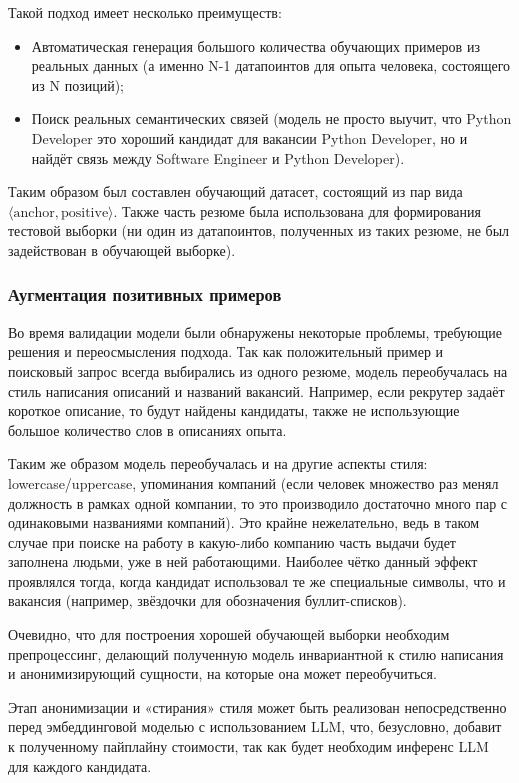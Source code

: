 \documentclass[14pt]{mmcs_article}
\begin{document}
Такой подход имеет несколько преимуществ:
\begin{itemize}
  \item Автоматическая генерация большого количества обучающих примеров из реальных данных (а именно N-1 датапоинтов для опыта человека, состоящего из N позиций);
  \item Поиск реальных семантических связей (модель не просто выучит, что Python Developer это хороший кандидат для вакансии Python Developer, но и найдёт связь между Software Engineer и Python Developer).
\end{itemize}

Таким образом был составлен обучающий датасет, состоящий из пар вида $\langle\text{anchor},\text{positive}\rangle$. Также часть резюме была использована для формирования тестовой выборки (ни один из датапоинтов, полученных из таких резюме, не был задействован в обучающей выборке).

\subsubsection{Аугментация позитивных примеров}

Во время валидации модели были обнаружены некоторые проблемы, требующие решения и переосмысления подхода.
Так как положительный пример и поисковый запрос всегда выбирались из одного резюме, модель переобучалась на стиль написания описаний и названий вакансий. Например, если рекрутер задаёт короткое описание, то будут найдены кандидаты, также не использующие большое количество слов в описаниях опыта.

Таким же образом модель переобучалась и на другие аспекты стиля: lowercase/uppercase, упоминания компаний (если человек множество раз менял должность в рамках одной компании, то это производило достаточно много пар с одинаковыми названиями компаний). Это крайне нежелательно, ведь в таком случае при поиске на работу в какую-либо компанию часть выдачи будет заполнена людьми, уже в ней работающими. Наиболее чётко данный эффект проявлялся тогда, когда кандидат использовал те же специальные символы, что и вакансия (например, звёздочки для обозначения буллит-списков).

Очевидно, что для построения хорошей обучающей выборки необходим препроцессинг, делающий полученную модель инвариантной к стилю написания и анонимизирующий сущности, на которые она может переобучиться.

Этап анонимизации и «стирания» стиля может быть реализован непосредственно перед эмбеддинговой моделью с использованием LLM, что, безусловно, добавит к полученному пайплайну стоимости, так как будет необходим инференс LLM для каждого кандидата.
\end{document}
